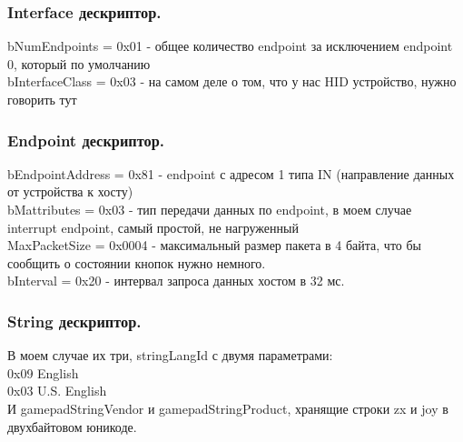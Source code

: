 \documentclass[12pt,a4paper]{article}
\begin{document}
\subsubsection{Interface дескриптор.}
    bNumEndpoints = 0x01 - общее количество endpoint за исключением endpoint 0,
    который по умолчанию\\
    bInterfaceClass = 0x03 - на самом деле о том, что у нас HID устройство,
    нужно говорить тут\\
\subsubsection{Endpoint дескриптор.}
    bEndpointAddress = 0x81 -  endpoint с адресом 1 типа IN (направление данных
    от устройства к хосту)\\
    bMattributes = 0x03 - тип передачи данных по endpoint, в моем случае
    interrupt endpoint, самый простой, не нагруженный\\
    MaxPacketSize = 0x0004 - максимальный размер пакета в 4 байта, что бы
    сообщить о состоянии кнопок нужно немного.\\
    bInterval = 0x20 - интервал запроса данных хостом в 32 мс.
\subsubsection{String дескриптор.}
    В моем случае их три, stringLangId с двумя параметрами:\\
    0x09 English\\
    0x03 U.S. English\\
    И gamepadStringVendor и gamepadStringProduct, хранящие строки zx и joy в
    двухбайтовом юникоде.
\end{document}
